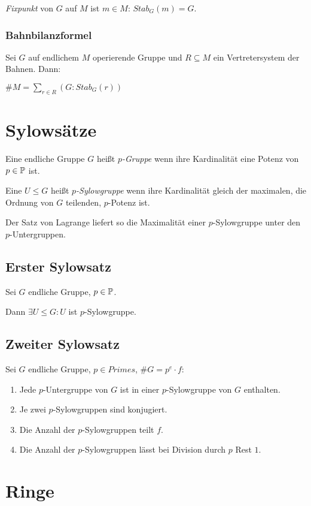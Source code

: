 \emph{Fixpunkt} von $G$ auf $M$ ist $m \in M$: $Stab_G(m) = G$.

\subsubsection*{Bahnbilanzformel}

Sei $G$ auf endlichem $M$ operierende Gruppe und $R \subseteq M$ ein Vertretersystem der Bahnen. Dann:

$\#M = \sum_{r \in R} (G : Stab_G(r))$

\section*{Sylowsätze}

Eine endliche Gruppe $G$ heißt \emph{$p$-Gruppe} wenn ihre Kardinalität eine Potenz von $p \in \mathbb{P}$ ist.

Eine $U \leq G$ heißt \emph{$p$-Sylowgruppe} wenn ihre Kardinalität gleich der maximalen, die Ordnung von $G$ teilenden, $p$-Potenz ist.

Der Satz von Lagrange liefert so die Maximalität einer $p$-Sylowgruppe unter den $p$-Untergruppen.

\subsection*{Erster Sylowsatz}

Sei $G$ endliche Gruppe, $p \in \mathbb{P}$.

Dann $\exists U \leq G : U$ ist $p$-Sylowgruppe.

\subsection*{Zweiter Sylowsatz}

Sei $G$ endliche Gruppe, $p \in Primes$, $\#G = p^e \cdot f$:

\begin{enumerate}[label=(\alph*)]
	\item Jede $p$-Untergruppe von $G$ ist in einer $p$-Sylowgruppe von $G$ enthalten.
	\item Je zwei $p$-Sylowgruppen sind konjugiert.
	\item Die Anzahl der $p$-Sylowgruppen teilt $f$.
	\item Die Anzahl der $p$-Sylowgruppen lässt bei Division durch $p$ Rest $1$.
\end{enumerate}

\section*{Ringe}

